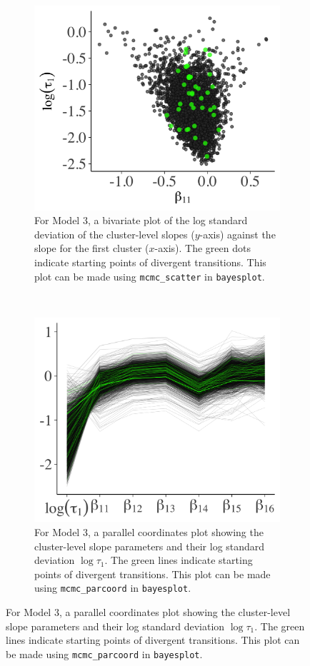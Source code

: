 \documentclass{statsoc}
\newcommand{\bayesplot}{{\tt bayesplot}}
\begin{document}
\begin{figure}
\centering
\begin{subfigure}{0.48\textwidth}
\includegraphics[width=\textwidth]{mcmc_scatter_divs.png}
\caption{For Model 3, a bivariate plot of the log standard deviation of the
cluster-level slopes ($y$-axis) against the slope for the first cluster
($x$-axis). The green dots indicate starting points of divergent transitions.
This plot can be made using {\tt mcmc\_scatter} in \bayesplot. }
\label{fig:mcmc_scatter_divs}
\end{subfigure}
~
\begin{subfigure}{0.48\textwidth}
\includegraphics[width=\textwidth]{mcmc_parcoord_divs.png}
\caption{For Model 3, a parallel coordinates plot showing the cluster-level
slope parameters and their log standard deviation $\log{\tau_1}$. The green
lines indicate starting points of divergent transitions. This plot can be made
using {\tt mcmc\_parcoord} in \bayesplot.}
\label{fig:mcmc_parcoord_divs}
\end{subfigure}


\end{figure}
\end{document}

